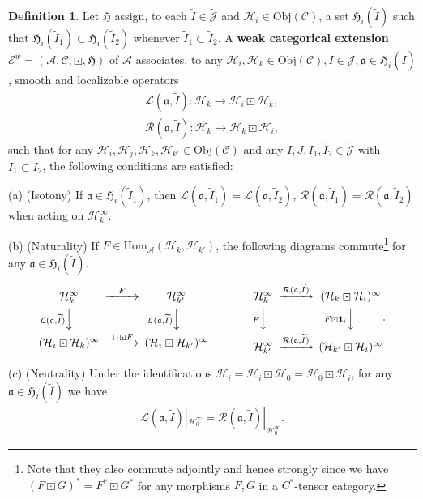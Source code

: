 \documentclass[11pt,b5paper,notitlepage]{article}
\theoremstyle{definition}
\newtheorem{df}{Definition}[subsection]
\theoremstyle{plain}
\newcommand{\fk}{\mathfrak}
\newcommand{\mc}{\mathcal}
\newcommand{\wtd}{\widetilde}
\newcommand{\id}{\mathbf{1}}
\newcommand{\Hom}{\mathrm{Hom}}
\newcommand{\scr}{\mathscr}
\newcommand{\Jtd}{\widetilde{\mathcal J}}
\newcommand{\Obj}{\mathrm{Obj}}
\numberwithin{equation}{subsection}
\begin{document}
\begin{df}\label{lb30}
Let $\fk H$ assign, to each $\wtd I\in\Jtd$ and $\mc H_i\in\Obj(\scr C)$, a set $\fk H_i(\wtd I)$  such that $\fk H_i(\wtd I_1)\subset\fk H_i(\wtd I_2)$  whenever $\wtd I_1\subset\wtd I_2$. A \textbf{weak categorical extension} $\scr E^w=(\mc A,\scr C,\boxdot,\fk H)$ of $\mc A$ associates, to any $\mc H_i,\mc H_k\in\Obj(\scr C),\wtd I\in\Jtd,\fk a\in\fk H_i(\wtd I)$, smooth and localizable operators
\begin{gather*}	
\mc L(\fk a,\wtd I):\mc H_k\rightarrow\mc H_i\boxdot\mc H_k,\\
\mc R(\fk a,\wtd I):\mc H_k\rightarrow\mc H_k\boxdot\mc H_i,
\end{gather*}
such that for any $\mc H_i,\mc H_j,\mc H_k,\mc H_{k'}\in\Obj(\scr C)$ and any $\wtd I,\wtd J,\wtd I_1,\wtd I_2\in\Jtd$ with $\wtd I_1\subset\wtd I_2$, the following conditions are satisfied:

	(a) (Isotony) If  $\fk a\in\fk H_i(\wtd I_1)$, then $\mc L(\fk a,\wtd I_1)=\mc L(\fk a,\wtd I_2)$, $\mc R(\fk a,\wtd I_1)=\mc R(\fk a,\wtd I_2)$ when acting on $\mc H_k^\infty$.
	
	(b) (Naturality) If  $F\in\Hom_{\mc A}(\mc H_k,\mc H_{k'})$,  the following diagrams commute\footnote{Note that they also commute adjointly and hence strongly since we have $(F\boxdot G)^*=F^*\boxdot G^*$ for any morphisms $F,G$ in a $C^*$-tensor category.}   for any $\fk a\in\fk H_i(\wtd I)$.
	\begin{gather}
	\begin{CD}
	\mc H_k^\infty @>F>> \mc H_{k'}^\infty\\
	@V \mc L(\fk a,\wtd I)  VV @V \mc L(\fk a,\wtd I)  VV\\
	(\mc H_i\boxdot\mc H_k)^\infty @> \id_i\boxdot F>> (\mc H_i\boxdot\mc H_{k'})^\infty
	\end{CD}\qquad\qquad
	\begin{CD}
	\mc H_k^\infty @> \mc R(\fk a,\wtd I)  >> (\mc H_k\boxdot\mc H_i)^\infty\\
	@V F VV @V F\boxdot\id_i  VV\\
	\mc H_{k'}^\infty @>\mc R(\fk a,\wtd I) >> (\mc H_{k'}\boxdot\mc H_i)^\infty
	\end{CD}.
	\end{gather}
	
	(c) (Neutrality) Under the identifications $\mc H_i=\mc H_i\boxdot\mc H_0=\mc H_0\boxdot\mc H_i$, for any $\fk a\in\fk H_i(\wtd I)$ we have
	\begin{align}
	\mc L(\fk a,\wtd I)|_{\mc H_0^\infty}=\mc R(\fk a,\wtd I)|_{\mc H_0^\infty}.	
	\end{align}
	

\end{df}
\end{document}
